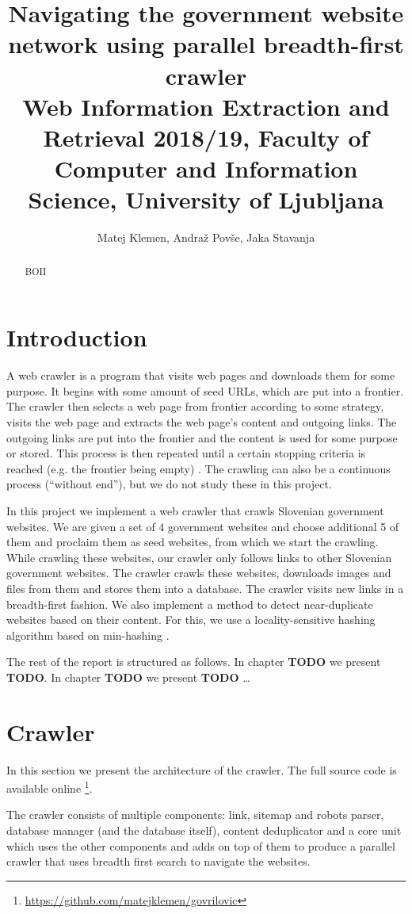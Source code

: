 \documentclass[9pt]{IEEEtran}
\title{\vspace{0ex} %
Navigating the government website network using parallel breadth-first crawler
\\ \normalsize{Web Information Extraction and Retrieval 2018/19, Faculty of Computer and Information Science, University of Ljubljana}}
\author{ %
Matej Klemen, Andraž Povše, Jaka Stavanja
\vspace{-4.0ex}
}
\begin{document}
\maketitle

\begin{abstract}
BOII
\end{abstract}

\section{Introduction}

A web crawler is a program that visits web pages and downloads them for some purpose.
It begins with some amount of seed URLs, which are put into a frontier.
The crawler then selects a web page from frontier according to some strategy, visits the web page and extracts the web page's content and outgoing links.
The outgoing links are put into the frontier and the content is used for some purpose or stored.
This process is then repeated until a certain stopping criteria is reached (e.g. the frontier being empty) \cite{Manning2008}.
The crawling can also be a continuous process (``without end''), but we do not study these in this project. 

In this project we implement a web crawler that crawls Slovenian government websites. 
We are given a set of 4 government websites and choose additional 5 of them and proclaim them as seed websites, from which we start the crawling.
While crawling these websites, our crawler only follows links to other Slovenian government websites.
The crawler crawls these websites, downloads images and files from them and stores them into a database. 
The crawler visits new links in a breadth-first fashion.
We also implement a method to detect near-duplicate websites based on their content.
For this, we use a locality-sensitive hashing algorithm based on min-hashing \cite{Gionis1999}.

The rest of the report is structured as follows.
In chapter \textbf{TODO} we present \textbf{TODO}.
In chapter \textbf{TODO} we present \textbf{TODO} \ldots

\section{Crawler}
In this section we present the architecture of the crawler. 
The full source code is available online \footnote{\url{https://github.com/matejklemen/govrilovic}}.

The crawler consists of multiple components: link, sitemap and robots parser, database manager (and the database itself), content deduplicator and a core unit which uses the other components and adds on top of them to produce a parallel crawler that uses breadth first search to navigate the websites.
\end{document}
